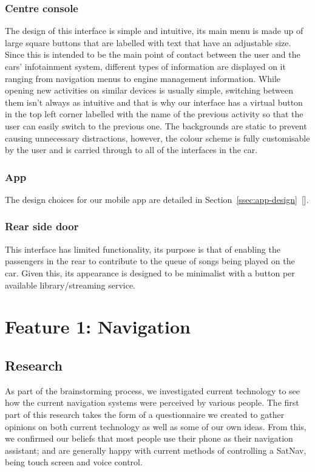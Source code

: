 \documentclass{article}
\begin{document}
\subsubsection{Centre console}\label{sssec:centre-console-aestethics}
The design of this interface is simple and intuitive, its main menu is made up of large square buttons that are labelled with text that have an adjustable size. Since this is intended to be the main point of contact between the user and the cars' infotainment system, different types of information are displayed on it ranging from navigation menus to engine management information. While opening new activities on similar devices is usually simple, switching between them isn't always as intuitive and that is why our interface has a virtual button in the top left corner labelled with the name of the previous activity so that the user can easily switch to the previous one. The backgrounds are static to prevent causing unnecessary distractions, however, the colour scheme is fully customisable by the user and is carried through to all of the interfaces in the car.

\subsubsection{App}\label{sssec:app-aestethics}
The design choices for our mobile app are detailed in Section~\ref{ssec:app-design}~[].
\subsubsection{Rear side door}\label{sssec:rear-door-device-aestethics}
This interface has limited functionality, its purpose is that of enabling the passengers in the rear to contribute to the queue of songs being played on the car. Given this, its appearance is designed to be minimalist with a button per available library/streaming service.

%
%
\section{Feature 1: Navigation}\label{sec:nav}

\subsection{Research}\label{ssec:nav-research}
As part of the brainstorming process, we investigated current technology to see how the current navigation systems were perceived by various people. The first part of this research takes the form of a questionnaire we created to gather opinions on both current technology as well as some of our own ideas. From this, we confirmed our beliefs that most people use their phone as their navigation assistant; and are generally happy with current methods of controlling a SatNav, being touch screen and voice control.
\end{document}

